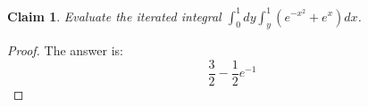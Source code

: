 \documentclass{article}
\newtheorem{theorem}{Claim}
\begin{document}
\begin{theorem}
Evaluate the iterated integral $\displaystyle{\int_0^1dy\int_y^1(e^{-x^2}+e^x)dx}$.
\end{theorem}

\begin{proof}
The answer is:
\[
\frac{3}{2}-\frac12 e^{-1}
\]
\end{proof}
\end{document}
